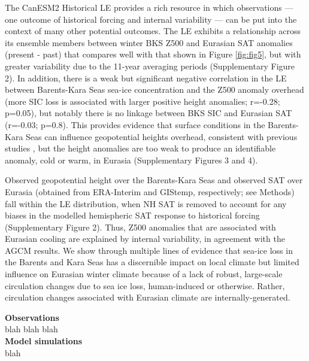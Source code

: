\documentclass{nature}
\begin{document}
The CanESM2 Historical LE provides a rich resource in which observations --- one outcome of historical forcing and internal variability --- can be put into the context of many other potential outcomes. The LE exhibits a relationship across its ensemble members between winter BKS Z500 and Eurasian SAT anomalies (present - past) that compares well with that shown in Figure \ref{fig:fig5}, but with greater variability due to the 11-year averaging periods (Supplementary Figure 2). In addition, there is a weak but significant negative correlation in the LE between Barents-Kara Seas sea-ice concentration and the Z500 anomaly overhead (more SIC loss is associated with larger positive height anomalies; r=-0.28; p=0.05), but notably there is no linkage between BKS SIC and Eurasian SAT (r=-0.03; p=0.8). This provides evidence that surface conditions in the Barents-Kara Seas can influence geopotential heights overhead, consistent with previous studies \cite{honda09,mori14}, but the height anomalies are too weak to produce an identifiable anomaly, cold or warm, in Eurasia (Supplementary Figures 3 and 4). 

Observed geopotential height over the Barents-Kara Seas and observed SAT over Eurasia (obtained from ERA-Interim and GIStemp, respectively; see Methods) fall within the LE distribution, when NH SAT is removed to account for any biases in the modelled hemispheric SAT response to historical forcing (Supplementary Figure 2). Thus, Z500 anomalies that are associated with Eurasian cooling are explained by internal variability, in agreement with the AGCM results. We show through multiple lines of evidence that sea-ice loss in the Barents and Kara Seas has a discernible impact on local climate but limited influence on Eurasian winter climate because of a lack of robust, large-scale circulation changes due to sea ice loss, human-induced or otherwise. Rather, circulation changes associated with Eurasian climate are internally-generated.  


\begin{methods}
\textbf{Observations} \\
blah blah blah
\\
\textbf{Model simulations}\\
blah
\end{methods}
\end{document}
